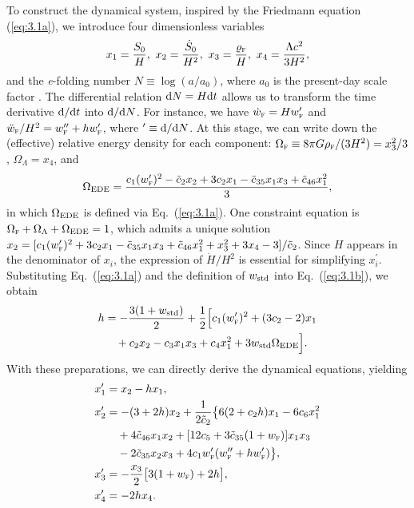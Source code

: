 \documentclass[aps,prd,twocolumn]{revtex4-2}
\newcommand\dx{{\rm d}}
\newcommand\subEDE{{\rm EDE}}
\newcommand\subF{\textsc{f}}
\newcommand\substd{{\rm std}}
\begin{document}
To construct the dynamical system, inspired by the Friedmann equation (\ref{eq:3.1a}), we introduce four dimensionless variables
\begin{equation}\label{eq:3.2}
  x_1 = \frac{S_0}{H},\
  x_2 = \frac{\dot{S}_0}{H^2},\
  x_3 = \frac{\varrho_\subF}{H}, \
  x_4 = \frac{\Lambda c^2}{3H^2},
\end{equation}
and the \textit{e}-folding number $N\equiv\log(a/a_0)$, where $a_0$ is the present-day scale factor \cite{Copeland1998.PRD.57.4686}. The differential relation $\dx N=H\dx t$ allows us to transform the time derivative $\dx/\dx t$ into $\dx/\dx N$. For instance, we have $\dot{w}_\subF = H w_\subF^\prime$ and $\ddot{w}_\subF/H^2 = w_\subF^{\prime\prime} + hw_\subF^\prime$, where ${}^{\prime}\equiv\dx/\dx N$. At this stage, we can write down the (effective) relative energy density for each component: $\Omega_\subF\equiv8\pi G\rho_\subF/(3H^2)=x_3^2/3$, $\Omega_\Lambda=x_4$, and
\begin{equation}\label{eq:3.3}
  \Omega_\subEDE = \frac{c_1(w_\subF^\prime)^2 - \tilde{c}_2x_2 + 3c_2x_1 - \tilde{c}_{35}x_1x_3 + \tilde{c}_{46}x_1^2}{3},
\end{equation}
in which $\Omega_\subEDE$ is defined via Eq.~(\ref{eq:3.1a}). One constraint equation is $\Omega_\subF+\Omega_\Lambda+\Omega_\subEDE=1$, which admits a unique solution $x_2=[c_1(w_\subF^\prime)^2 + 3c_2x_1 - \tilde{c}_{35}x_1x_3 + \tilde{c}_{46}x_1^2 + x_3^2 + 3x_4 - 3]/\tilde{c}_2$. Since $H$ appears in the denominator of $x_i$, the expression of $\dot{H}/H^2$ is essential for simplifying $x_i^\prime$. Substituting Eq.~(\ref{eq:3.1a}) and the definition of $w_\substd$ into Eq.~(\ref{eq:3.1b}), we obtain
\begin{align}\label{eq:3.4}
  h &= - \frac{3(1+w_\substd)}{2} + \frac{1}{2}\Big[c_1(w_\subF^\prime)^2 + (3c_2-2)x_1 \nonumber\\
    &\quad + c_2x_2 - c_3x_1x_3 + c_4x_1^2 + 3w_\substd\Omega_\subEDE\Big].
\end{align}
With these preparations, we can directly derive the dynamical equations, yielding
\begin{subequations}\label{eq:3.5}
\begin{align}
  x_1^\prime &= x_2-hx_1, \\
  x_2^\prime &= - (3+2h)x_2 + \frac{1}{2\tilde{c}_2}\big\{6(2+c_2h)x_1 - 6c_6x_1^2 \nonumber\\
    &\quad + 4\tilde{c}_{46}x_1x_2 + [12c_5+3\tilde{c}_{35}(1+w_\subF)]x_1x_3 \nonumber\\
    &\quad - 2\tilde{c}_{35}x_2x_3 + 4c_1w_\subF^\prime(w_\subF^{\prime\prime}+hw_\subF^\prime)\big\}, \\
  x_3^\prime &= -\frac{x_3}{2}\big[3(1+w_\subF)+2h\big], \\
  x_4^\prime &= -2hx_4.
\end{align}
\end{subequations}
\end{document}
